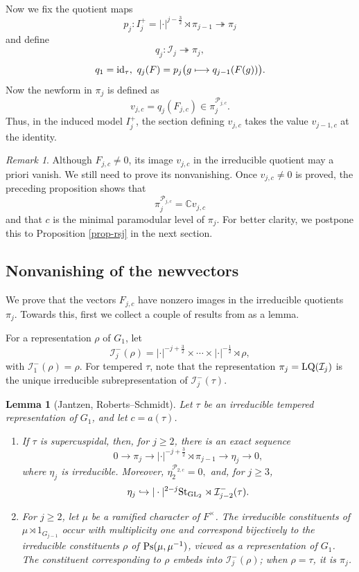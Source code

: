 \documentclass[12pt]{amsart}
\newtheorem{lemma}[theorem]{Lemma}%
\theoremstyle{definition}
\theoremstyle{remark}
\newtheorem{remark}{Remark}
\begin{document}
Now we fix the quotient maps
\[
p_j:I_j^+
=
|\cdot|^{j-\frac{3}{2}}\rtimes\pi_{j-1}
\twoheadrightarrow\pi_j
\]
and define 
\[
q_j:\mathcal I_j\twoheadrightarrow\pi_j,\]
\begin{equation}\label{eq-compatible}
q_1={\rm id}_\tau,
~
q_j(F)=p_j\bigl(g\longmapsto q_{j-1}(F(g))\bigr).
\end{equation}
Now the newform in $\pi_j$ is defined as
\[
v_{j,c}=q_j(F_{j,c})\in\pi_j^{\mathcal P_{j,c}}.
\]
Thus, in the induced model $I_j^+$, the section defining $v_{j,c}$ takes the value $v_{j-1,c}$ at the identity. 

\begin{remark}\label{vjc-nonvanishing}
Although $F_{j,c}\neq0$, its image $v_{j,c}$ in the irreducible quotient may a priori vanish. We still need to prove its nonvanishing. Once $v_{j,c}\neq0$ is proved, the preceding proposition shows that
\[
\pi_j^{\mathcal P_{j,c}}=\mathbb C v_{j,c}
\]
and that $c$ is the minimal paramodular level of $\pi_j$. For better clarity, we postpone this to Proposition \ref{prop-rsj} in the next section.
\end{remark}

\subsection{Nonvanishing of the newvectors}

We prove that the vectors $F_{j,c}$ have nonzero images in the irreducible quotients $\pi_j$. Towards this, first we collect a couple of results from \cite{jan96,rs07} as a lemma.

For a representation $\rho$ of $G_1$, let
\[
\mathcal I_j^-(\rho)
=
|\cdot|^{-j+\frac{3}{2}}\times\cdots\times|\cdot|^{-\frac{1}{2}}\rtimes\rho,\]
with $\mathcal I_1^-(\rho)=\rho$. 
For tempered $\tau$, note that the representation $\pi_j ={\rm LQ}(\mathcal I_j)$ is the unique irreducible subrepresentation of $\mathcal I_j^-(\tau)$.

\begin{lemma}[Jantzen, Roberts–Schmidt]\label{lemma-jantzen}
Let $\tau$ be an irreducible tempered representation of $G_1$, and let $c=a(\tau)$.
\begin{enumerate}
\item\label{i}
If $\tau$ is supercuspidal, then, for $j\geq2$, there is an exact sequence
\[
0\rightarrow\pi_j
\rightarrow|\cdot|^{-j+\frac{3}{2}}\rtimes\pi_{j-1}
\rightarrow\eta_j
\rightarrow 0,
\]
where $\eta_j$ is irreducible. Moreover,
$
\eta_2^{\mathcal P_{2,c}}=0,
$
and, for $j\geq3$,
\[
\eta_j\hookrightarrow
|\cdot|^{2-j}{\rm St}_{{\rm GL}_2}\rtimes
\mathcal I_{j-2}^-(\tau).
\]
\item\label{ii} 
For $j \geq 2$, let $\mu$ be a ramified character of $F^\times$. The irreducible constituents of
$
\mu\rtimes 1_{G_{j-1}}
$
occur with multiplicity one and correspond bijectively to the irreducible constituents $\rho$ of  ${\rm Ps}(\mu,\mu^{-1})$, viewed as a representation of $G_1$. The constituent corresponding to $\rho$ embeds into $\mathcal I_j^-(\rho)$; when $\rho=\tau$, it is $\pi_j$.
\end{enumerate}
\end{lemma}
\end{document}
